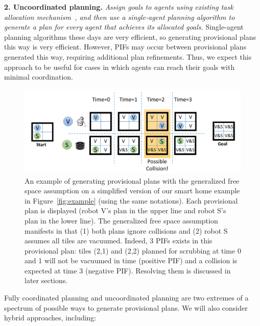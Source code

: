 \documentclass[11pt]{article}
\begin{document}


{\bf 2. Uncoordinated planning.} {\em Assign goals to agents using existing task allocation mechanism~\cite{hunsberger2000combinatorial,sander2002scalable}, and then use a single-agent planning algorithm to generate a plan for every agent that achieves its allocated goals. }
Single-agent planning algorithms these days are very efficient, so generating provisional plans this way is very efficient. However, PIFs may occur between provisional plans generated this way, requiring additional plan refinements. Thus, we expect this approach to be useful for cases in which agents can reach their goals with minimal coordination. 


\begin{figure}%
\centering
\includegraphics[width=0.8\columnwidth]{free-space_cropped.pdf}%
\vspace{-0.4cm}
\caption{{\small An example of generating provisional plans with the generalized free space assumption on a simplified version of our smart home example in Figure~\ref{fig:example} (using the same notations). 
Each provisional plan is displayed (robot V's plan in the upper line and robot S's plan in the lower line). The generalized free space assumption manifests in that (1) both plans ignore collisions and (2) robot S assumes all tiles are vacuumed. Indeed, 3 PIFs exists in this provisional plan: tiles (2,1) and (2,2) planned for scrubbing at time 0 and 1 will not be vacuumed in time (positive PIF) and a collision is expected at time 3 (negative PIF). Resolving them is discussed in later sections.}}
\label{fig:free-space}
\end{figure}


Fully coordinated planning and uncoordinated planning are two extremes of a spectrum of possible ways to generate provisional plans. We will also consider hybrid approaches, including:
\end{document}
